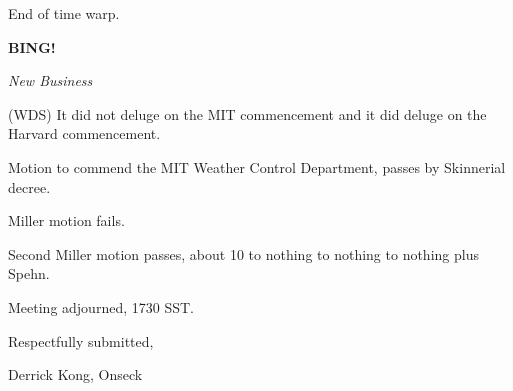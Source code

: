 \documentclass[12pt]{article}
\newcommand{\bing}{{\bf BING!} }
\newcommand{\goto}[1]{\bing \vskip 12pt \centerline{{\em{#1}}}}
\begin{document}
End of time warp.

\goto{New Business}

(WDS) It did not deluge on the MIT commencement and it did deluge on the Harvard commencement.

Motion to commend the MIT Weather Control Department, passes by Skinnerial decree.

Miller motion fails.

Second Miller motion passes, about 10 to nothing to nothing to nothing plus Spehn.

\vspace{12pt}

\noindent
Meeting adjourned, 1730 SST.

\vspace{18pt}

\centerline{Respectfully submitted,}
\centerline{Derrick Kong, Onseck}
\end{document}
